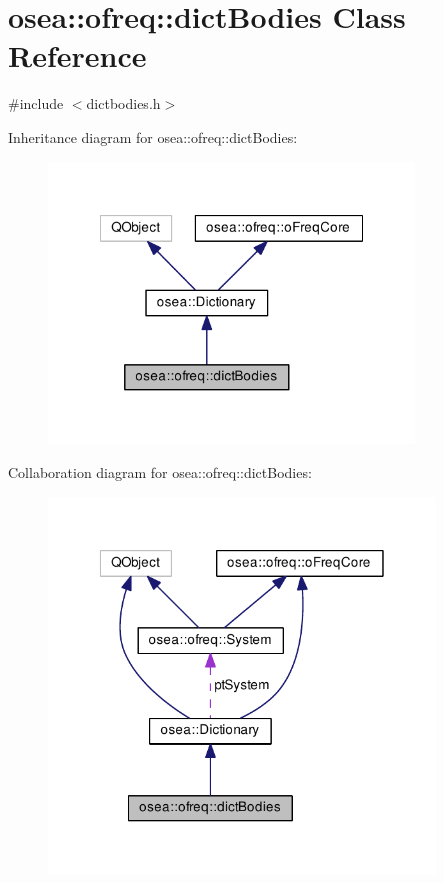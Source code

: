 \hypertarget{classosea_1_1ofreq_1_1dict_bodies}{\section{osea\-:\-:ofreq\-:\-:dict\-Bodies Class Reference}
\label{classosea_1_1ofreq_1_1dict_bodies}
}


{\ttfamily \#include $<$dictbodies.\-h$>$}



Inheritance diagram for osea\-:\-:ofreq\-:\-:dict\-Bodies\-:
\nopagebreak
\begin{figure}[H]
\begin{center}
\leavevmode
\includegraphics[width=275pt]{classosea_1_1ofreq_1_1dict_bodies__inherit__graph}
\end{center}
\end{figure}


Collaboration diagram for osea\-:\-:ofreq\-:\-:dict\-Bodies\-:
\nopagebreak
\begin{figure}[H]
\begin{center}
\leavevmode
\includegraphics[width=291pt]{classosea_1_1ofreq_1_1dict_bodies__coll__graph}
\end{center}
\end{figure}
